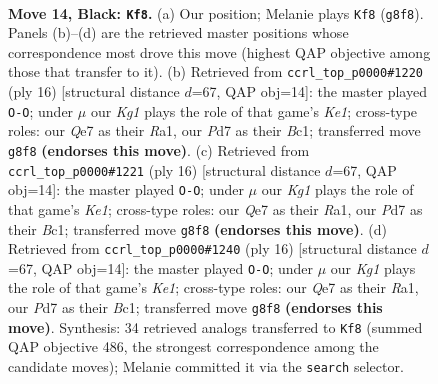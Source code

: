 \documentclass[11pt]{article}
\begin{document}
\clearpage

\begin{figure}[p]\centering
\begin{subfigure}{0.46\textwidth}\centering
\resizebox{\linewidth}{!}{%
\newchessgame
\chessboard[
  setfen={r1bnr1k1/1pppqppp/p4n2/3P4/8/2B1PNP1/PP3PBP/R2Q1RK1 b - - 4 14},
  showmover=false,
  pgfstyle=straightmove, color=movearrow, markmove={g8-f8}
]}
\caption{}
\end{subfigure}\hfill
\begin{subfigure}{0.46\textwidth}\centering
\resizebox{\linewidth}{!}{%
\newchessgame
\chessboard[
  setfen={rnbq1rk1/pp3pbp/3p1np1/2pP4/8/2N2NP1/PP2PPBP/R1BQK2R w KQ - 4 9},
  showmover=false,
  pgfstyle=straightmove, color=movearrow, markmove={e1-g1}
]}
\caption{}
\end{subfigure}
\\[4pt]
\begin{subfigure}{0.46\textwidth}\centering
\resizebox{\linewidth}{!}{%
\newchessgame
\chessboard[
  setfen={rnbq1rk1/pp3pbp/3p1np1/2pP4/8/2N2NP1/PP2PPBP/R1BQK2R w KQ - 4 9},
  showmover=false,
  pgfstyle=straightmove, color=movearrow, markmove={e1-g1}
]}
\caption{}
\end{subfigure}\hfill
\begin{subfigure}{0.46\textwidth}\centering
\resizebox{\linewidth}{!}{%
\newchessgame
\chessboard[
  setfen={rnbq1rk1/pp3pbp/3p1np1/2pP4/8/2N2NP1/PP2PPBP/R1BQK2R w KQ - 4 9},
  showmover=false,
  pgfstyle=straightmove, color=movearrow, markmove={e1-g1}
]}
\caption{}
\end{subfigure}
\caption{\textbf{Move 14, Black: \texttt{Kf8}.} (a) Our position; Melanie plays \texttt{Kf8} (\texttt{g8f8}). Panels (b)--(d) are the retrieved master positions whose correspondence most drove this move (highest QAP objective among those that transfer to it). (b) Retrieved from \texttt{ccrl\_top\_p0000\#1220} (ply 16) [structural distance $d$=67, QAP obj=14]: the master played \texttt{O-O}; under $\mu$ our \emph{Kg1} plays the role of that game's \emph{Ke1}; cross-type roles: our \emph{Q}e7 as their \emph{R}a1, our \emph{P}d7 as their \emph{B}c1; transferred move \texttt{g8f8} \textbf{(endorses this move)}. (c) Retrieved from \texttt{ccrl\_top\_p0000\#1221} (ply 16) [structural distance $d$=67, QAP obj=14]: the master played \texttt{O-O}; under $\mu$ our \emph{Kg1} plays the role of that game's \emph{Ke1}; cross-type roles: our \emph{Q}e7 as their \emph{R}a1, our \emph{P}d7 as their \emph{B}c1; transferred move \texttt{g8f8} \textbf{(endorses this move)}. (d) Retrieved from \texttt{ccrl\_top\_p0000\#1240} (ply 16) [structural distance $d$=67, QAP obj=14]: the master played \texttt{O-O}; under $\mu$ our \emph{Kg1} plays the role of that game's \emph{Ke1}; cross-type roles: our \emph{Q}e7 as their \emph{R}a1, our \emph{P}d7 as their \emph{B}c1; transferred move \texttt{g8f8} \textbf{(endorses this move)}. Synthesis: 34 retrieved analogs transferred to \texttt{Kf8} (summed QAP objective 486, the strongest correspondence among the candidate moves); Melanie committed it via the \texttt{search} selector.}
\label{fig:thought-m27}
\end{figure}
\end{document}
